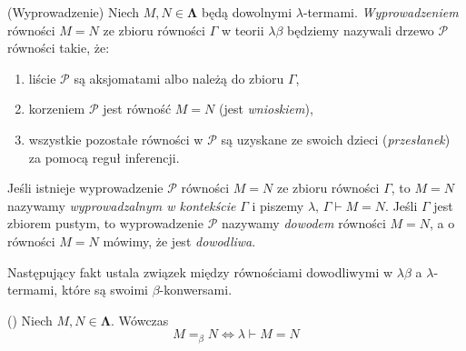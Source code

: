 \begin{definicja}(Wyprowadzenie)
Niech \(M, N\in\mathbf{\Lambda}\) będą dowolnymi \(\lambda\)-termami.
\emph{Wyprowadzeniem} równości \(M=N\) ze zbioru równości \(\Gamma\) w teorii \(\lambda\beta\) będziemy nazywali drzewo \(\mathcal{P}\) równości takie, że:
\begin{enumerate}[label={(\roman*)}, ref={(\roman*)}]
  \setlength\itemsep{0em}
  \item liście \(\mathcal{P}\) są aksjomatami albo należą do zbioru \(\Gamma\),
  \item korzeniem \(\mathcal{P}\) jest równość \(M=N\) (jest \emph{wnioskiem}),
  \item wszystkie pozostałe równości w \(\mathcal{P}\) są uzyskane ze swoich dzieci (\emph{przesłanek}) za pomocą reguł inferencji.
\end{enumerate}

Jeśli istnieje wyprowadzenie \(\mathcal{P}\) równości \(M=N\) ze zbioru równości \(\Gamma\), to \(M=N\) nazywamy \emph{wyprowadzalnym w kontekście} \(\Gamma\) i piszemy \(\lambda,\,\Gamma\vdash M=N\). Jeśli \(\Gamma\) jest zbiorem pustym, to wyprowadzenie \(\mathcal{P}\) nazywamy \emph{dowodem} równości \(M=N\), a o równości \(M=N\) mówimy, że jest \emph{dowodliwa}.
\end{definicja}

Następujący fakt ustala związek między równościami dowodliwymi w \(\lambda\beta\) a \(\lambda\)-termami, które są swoimi \(\beta\)-konwersami.
\begin{fakt}(\cite[Lem. 6.4]{Hindley:2008:LCI:1388400})
Niech \(M, N\in\mathbf{\Lambda}\). Wówczas
\[
M=_\beta N \iff \lambda \vdash M=N
\]
\end{fakt}
